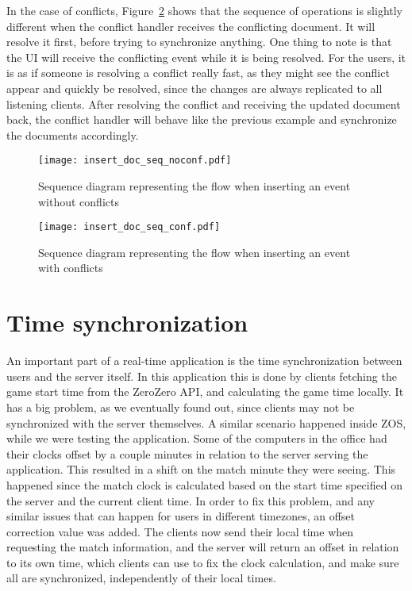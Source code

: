 In the case of conflicts, Figure~\ref{fig:insert_doc_seq_conf} shows that the sequence of operations is slightly different when the conflict handler receives the conflicting document. It will resolve it first, before trying to synchronize anything. One thing to note is that the UI will receive the conflicting event while it is being resolved. For the users, it is as if someone is resolving a conflict really fast, as they might see the conflict appear and quickly be resolved, since the changes are always replicated to all listening clients. After resolving the conflict and receiving the updated document back, the conflict handler will behave like the previous example and synchronize the documents accordingly.

\begin{figure}[h]
    \begin{center}
        \leavevmode
        \texttt{[image: insert\_doc\_seq\_noconf.pdf]}
        \caption{Sequence diagram representing the flow when inserting an event without conflicts}
        \label{fig:insert_doc_seq_noconf}
    \end{center}
\end{figure}

\begin{figure}[h]
    \begin{center}
        \leavevmode
        \texttt{[image: insert\_doc\_seq\_conf.pdf]}
        \caption{Sequence diagram representing the flow when inserting an event with conflicts}
        \label{fig:insert_doc_seq_conf}
    \end{center}
\end{figure}

\section{Time synchronization}

An important part of a real-time application is the time synchronization between users and the server itself. In this application this is done by clients fetching the game start time from the ZeroZero API, and calculating the game time locally. It has a big problem, as we eventually found out, since clients may not be synchronized with the server themselves. A similar scenario happened inside ZOS, while we were testing the application. Some of the computers in the office had their clocks offset by a couple minutes in relation to the server serving the application. This resulted in a shift on the match minute they were seeing. This happened since the match clock is calculated based on the start time specified on the server and the current client time. In order to fix this problem, and any similar issues that can happen for users in different timezones, an offset correction value was added. The clients now send their local time when requesting the match information, and the server will return an offset in relation to its own time, which clients can use to fix the clock calculation, and make sure all are synchronized, independently of their local times.

